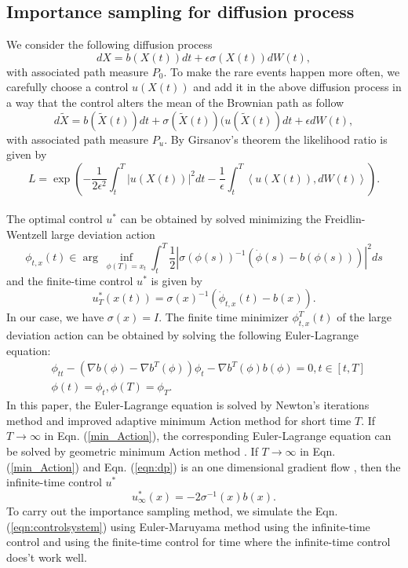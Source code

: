 \documentclass[journal,transmag]{IEEEtran}
\begin{document}
\subsection{Importance sampling for diffusion process}
We consider the following diffusion process
 \begin{equation} \label{eqn:dp}
d X = b(X(t))dt + \epsilon \sigma(X(t))dW(t),
\end{equation}
with associated path measure $P_0$. To make the rare events happen more often, we carefully choose a control $u(X(t))$ and  add it in the above diffusion process in a way that the control alters the mean of the Brownian path as follow
\begin{equation} \label{eqn:controlsystem}
 d \tilde{X} = b(\tilde{X}(t))dt +  \sigma(\tilde{X}(t))(u(\tilde{X}(t))dt +  \epsilon dW(t),
 \end{equation}
with associated path measure $P_u$. By Girsanov's theorem the likelihood ratio is given by
\begin{equation}
L = \exp(-\frac{1}{2\epsilon^2}\int_t^T|u(X(t))|^2 dt - \frac{1}{\epsilon}\int_t^T \left<u(X(t)),dW(t)\right>).
\end{equation}
\\
The optimal control $u^*$ can be obtained by solved minimizing the Freidlin-Wentzell large deviation action \cite{RES_Eric}
\begin{equation} \label{min_Action}
\phi_{t,x}(t)  \in \arg\ \inf_{\phi(T) = x_t} \int_t^T \frac{1}{2}| \sigma(\phi(s))^{-1}(\dot{\phi}(s) - b(\phi(s)))|^2 ds
\end{equation}
and the finite-time control $u^*$ is given by
\begin{equation} \label{control:1}
u^*_T(x(t)) = \sigma(x)^{-1}(\dot{\phi}_{t,x}(t) - b(x)).
\end{equation}
In our case, we have $\sigma(x) = I$. The finite time minimizer $\phi_{t,x}^T(t)$ of the large deviation action can be obtained by solving the following Euler-Lagrange equation:
\begin{align} \label{Eqn:E_L} \nonumber
&\phi_{tt} - (\nabla b(\phi) -\nabla b^T(\phi)  )\phi_{t} - \nabla b^T(\phi) b(\phi) = 0 , t \in [t,T]\\
&\phi(t) = \phi_t,  \phi(T) = \phi_T.
\end{align}
In this paper, the Euler-Lagrange equation is solved by Newton's iterations method and improved adaptive minimum Action method \cite{IAMAM} for short time $T$.
If $T \rightarrow \infty$ in Eqn. (\ref{min_Action}), the corresponding Euler-Lagrange equation can be solved by geometric minimum Action method \cite{heymann_geometric_2008}.
If $T \rightarrow \infty$ in Eqn. (\ref{min_Action}) and Eqn. (\ref{eqn:dp}) is an one dimensional gradient flow \cite{freidlin_random_2012},
then the infinite-time control $u^*$
\begin{equation} \label{control:2}
u^*_\infty(x) = -2\sigma^{-1}(x){b(x)}.
\end{equation}
To carry out the importance sampling method, we simulate the Eqn. (\ref{eqn:controlsystem}) using Euler-Maruyama method using the infinite-time control and using the finite-time control for time where the infinite-time control does't work well.
\end{document}

